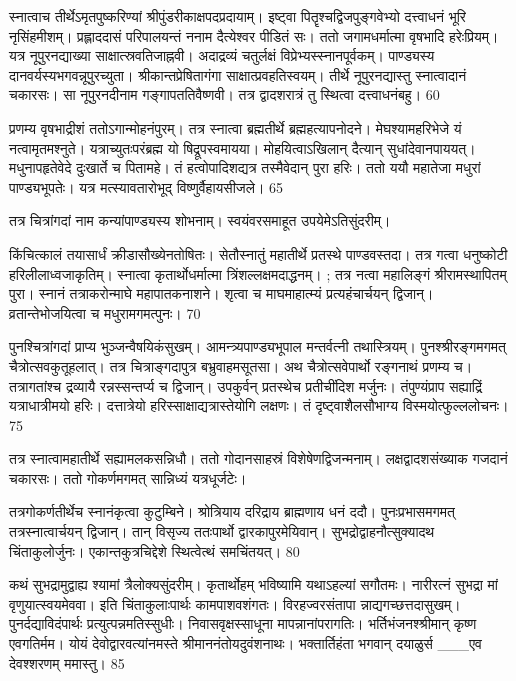 स्नात्वाच तीर्थेऽमृतपुष्करिण्यां
श्रीपुंडरीकाक्षपदप्रदायाम्।
इष्ट्वा पितॄश्चद्विजपुङ्गवेभ्यो
दत्त्वाधनं भूरि नृसिंहमीशम्।
प्रह्लाददासं परिपालयन्तं ननाम
दैत्येश्वर पीडितं सः।
ततो जगामधर्मात्मा वृषभादि हरेःप्रियम्।
यत्र नूपुरनद्याख्या साक्षात्स्रवतिजाह्नवी।
अदाद्रव्यं चतुर्लक्षं विप्रेभ्यस्स्नानपूर्वकम्।
पाण्ड्यस्य दानवर्यस्यभगवन्नूपुरच्युता।
श्रीकान्तप्रेषितागंगा साक्षात्प्रवहतिस्वयम्।
तीर्थे नूपुरनद्यास्तु स्नात्वादानं चकारसः।
सा नूपुरनदीनाम गङ्गापततिवैष्णवी।
तत्र द्वादशरात्रं तु स्थित्वा दत्त्वाधनंबहु।
60

प्रणम्य वृषभाद्रीशं ततोऽगान्मोहनंपुरम्।
तत्र स्नात्वा ब्रह्मतीर्थे ब्रह्महत्यापनोदने।
मेघश्यामहरिभेजे यं नत्वामृतमश्नुते।
यत्राच्युतःपरंब्रह्म यो षिद्रूपस्वमायया।
मोहयित्वाऽखिलान् दैत्यान् सुधांदेवानपाययत्।
मधुनापहृतेवेदे दुःखार्ते च पितामहे।
तं हत्वोपादिशद्यत्र तस्मैवेदान् पुरा हरिः।
ततो ययौ महातेजा मधुरां पाण्ड्यभूपतेः।
यत्र मत्स्यावतारोभूद् विष्णुर्वैहायसीजले।
65

तत्र चित्रांगदां नाम कन्यांपाण्ड्यस्य शोभनाम्।
स्वयंवरसमाहूत उपयेमेऽतिसुंदरीम्।

किंचित्कालं तयासार्धं क्रीडासौख्येनतोषितः।
सेतौस्नातुं महातीर्थे प्रतस्थे पाण्डवस्तदा।
तत्र गत्वा धनुष्कोटी हरिलीलाध्वजाकृतिम्।
स्नात्वा कृतार्थोधर्मात्मा त्रिंशल्लक्षमदाद्धनम्।
; तत्र नत्वा महालिङ्गं श्रीरामस्थापितम् पुरा।
स्नानं तत्राकरोन्माघे महापातकनाशने।
शृत्वा च माघमाहात्म्यं प्रत्यहंचार्चयन् द्विजान्।
व्रतान्तेभोजयित्वा च मधुरामगमत्पुनः।
70

पुनश्चित्रांगदां प्राप्य भुञ्जन्वैषयिकंसुखम्।
आमन्त्र्यपाण्ड्यभूपाल मन्तर्वत्नी तथास्त्रियम्।
पुनश्श्रीरङ्गमगमत् चैत्रोत्सवकुतूहलात्।
तत्र चित्राङ्गदापुत्र बभ्रुवाहमसूतसा।
अथ चैत्रोत्सवेपार्थो रङ्गनाथं प्रणम्य च।
तत्रागतांश्च द्रव्यायै रन्नस्सन्तर्प्य च द्विजान्।
उपकुर्वन् प्रतस्थेच प्रतीचींदिश मर्जुनः।
तंपुण्यंप्राप सह्याद्रिं यत्राधात्रीमयो हरिः।
दत्तात्रेयो हरिस्साक्षाद्यत्रास्तेयोगि लक्षणः।
तं दृष्ट्वाशैलसौभाग्य विस्मयोत्फुल्ललोचनः।
75

तत्र स्नात्वामहातीर्थे सह्यामलकसन्निधौ।
ततो गोदानसाहस्रं विशेषेणद्विजन्मनाम्।
लक्षद्वादशसंख्याक गजदानं चकारसः।
ततो गोकर्णमगमत् सान्निध्यं यत्रधूर्जटेः।

तत्रगोकर्णतीर्थेच स्नानंकृत्वा कुटुम्बिने।
श्रोत्रियाय दरिद्राय ब्राह्मणाय धनं ददौ।
पुनःप्रभासमगमत् तत्रस्नात्वार्चयन् द्विजान्।
तान् विसृज्य ततःपार्थो द्वारकापुरमेयिवान्।
सुभद्रोद्वाहनौत्सुक्यादथ चिंताकुलोर्जुनः।
एकान्तकुत्रचिद्देशे स्थित्वेत्थं समचिंतयत्।
80

कथं सुभद्रामुद्वाह्य श्यामां त्रैलोक्यसुंदरीम्।
कृतार्थोहम् भविष्यामि यथाऽहल्यां सगौतमः।
नारीरत्नं सुभद्रा मां वृणुयात्स्वयमेववा।
इति चिंताकुलाःपार्थः कामपाशवशंगतः।
विरहज्वरसंतापा न्नाद्यगच्छत्तदासुखम्।
पुनर्दद्याविदंपार्थः प्रत्युत्पन्नमतिस्सुधीः।
निवासवृक्षस्साधूना मापन्नानांपरागतिः।
भर्तिभंजनश्श्रीमान् कृष्ण एवगतिर्मम।
योयं देवोद्वारवत्यांनमस्ते श्रीमाननंतोयदुवंशनाथः।
भक्तार्तिहंता भगवान् दयाळुर्स
___एव देवश्शरणम् ममास्तु।
85


